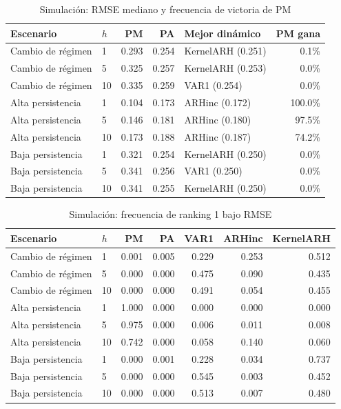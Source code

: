 \documentclass[a4paper,11pt]{article}
\begin{document}
\begin{table}[H]
\centering
\caption{Simulación: RMSE mediano y frecuencia de victoria de PM}
\label{tab:sim_summary}
\scriptsize
\begin{tabular}{llrrlr}
\toprule
Escenario & \(h\) & PM & PA & Mejor dinámico & PM gana \\
\midrule
Cambio de régimen & 1 & 0.293 & 0.254 & KernelARH (0.251) & 0.1\% \\
Cambio de régimen & 5 & 0.325 & 0.257 & KernelARH (0.253) & 0.0\% \\
Cambio de régimen & 10 & 0.335 & 0.259 & VAR1 (0.254) & 0.0\% \\
Alta persistencia & 1 & 0.104 & 0.173 & ARHinc (0.172) & 100.0\% \\
Alta persistencia & 5 & 0.146 & 0.181 & ARHinc (0.180) & 97.5\% \\
Alta persistencia & 10 & 0.173 & 0.188 & ARHinc (0.187) & 74.2\% \\
Baja persistencia & 1 & 0.321 & 0.254 & KernelARH (0.250) & 0.0\% \\
Baja persistencia & 5 & 0.341 & 0.256 & VAR1 (0.250) & 0.0\% \\
Baja persistencia & 10 & 0.341 & 0.255 & KernelARH (0.250) & 0.0\% \\
\bottomrule
\end{tabular}
\end{table}

\begin{table}[H]
\centering
\caption{Simulación: frecuencia de ranking 1 bajo RMSE}
\label{tab:sim_rankings}
\scriptsize
\begin{tabular}{llrrrrr}
\toprule
Escenario & \(h\) & PM & PA & VAR1 & ARHinc & KernelARH \\
\midrule
Cambio de régimen & 1 & 0.001 & 0.005 & 0.229 & 0.253 & 0.512 \\
Cambio de régimen & 5 & 0.000 & 0.000 & 0.475 & 0.090 & 0.435 \\
Cambio de régimen & 10 & 0.000 & 0.000 & 0.491 & 0.054 & 0.455 \\
Alta persistencia & 1 & 1.000 & 0.000 & 0.000 & 0.000 & 0.000 \\
Alta persistencia & 5 & 0.975 & 0.000 & 0.006 & 0.011 & 0.008 \\
Alta persistencia & 10 & 0.742 & 0.000 & 0.058 & 0.140 & 0.060 \\
Baja persistencia & 1 & 0.000 & 0.001 & 0.228 & 0.034 & 0.737 \\
Baja persistencia & 5 & 0.000 & 0.000 & 0.545 & 0.003 & 0.452 \\
Baja persistencia & 10 & 0.000 & 0.000 & 0.513 & 0.007 & 0.480 \\
\bottomrule
\end{tabular}
\end{table}
\end{document}
